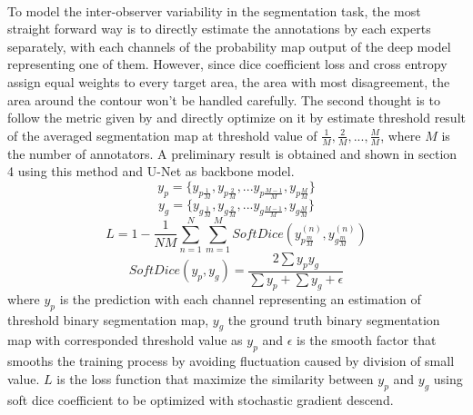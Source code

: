 \documentclass[12pt]{extarticle}
\begin{document}
\paragraph{}
To model the inter-observer variability in the segmentation task, 
the most straight forward way is to directly estimate the annotations
 by each experts separately, with each channels of the probability 
 map output of the deep model representing one of them. However, since dice coefficient loss and cross entropy 
assign equal weights to every target area, the area with most disagreement, 
the area around the contour won't be handled carefully\cite{Kervadec_2021}.
The second thought is to follow the metric given by \cite{qubiq} and directly 
optimize on it by estimate threshold result of the averaged segmentation map 
at threshold value of $\frac{1}{M}, \frac{2}{M}, ..., \frac{M}{M}$, 
where $M$ is the number of annotators. A preliminary result is obtained and 
shown in section 4 using this method and U-Net as backbone model.
\begin{equation}
    y_{p} = \{y_{p\frac{1}{M}}, y_{p\frac{2}{M}}, ... y_{p\frac{M-1}{M}},y_{p\frac{M}{M}}\}
\end{equation}
\begin{equation}
    y_{g} = \{y_{g\frac{1}{M}}, y_{g\frac{2}{M}}, ... y_{g\frac{M-1}{M}},y_{g\frac{M}{M}}\}
\end{equation}
\begin{equation}
    L = 1 - \frac{1}{NM}\sum_{n=1}^{N}\sum_{m=1}^{M}SoftDice(y_{p\frac{m}{M}}^{(n)}, y_{g\frac{m}{M}}^{(n)})
\end{equation}
\begin{equation}
    SoftDice(y_p, y_g) = \frac{2\sum y_p y_g}{\sum y_p +  \sum y_g + \epsilon}
\end{equation}
where $y_p$ is the prediction with each
channel representing an estimation of threshold binary segmentation map, 
$y_g$ the ground truth binary segmentation map with corresponded threshold 
value as $y_p$ and $\epsilon$ is the smooth factor that smooths 
the training process by avoiding fluctuation caused by division of small value.
$L$ is the loss function that maximize the similarity 
between $y_p$ and $y_g$ using soft dice coefficient 
to be optimized with stochastic gradient descend. 
\end{document}
